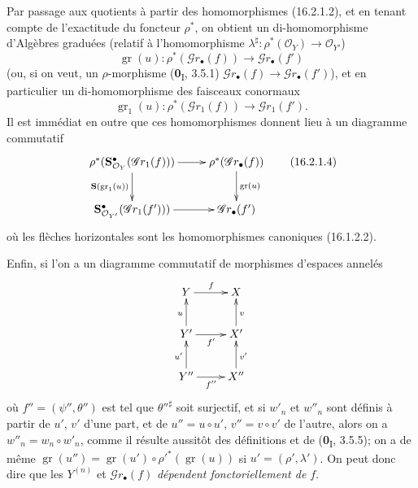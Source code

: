\begin{env}[16.2.1]
Par passage aux quotients à partir des homomorphismes (16.2.1.2), et en tenant
compte de l'exactitude du foncteur $\rho^*$, on obtient un di-homomorphisme
d'Algèbres graduées (relatif à l'homomorphisme
$\lambda^\sharp:\rho^*(\mathcal{O}_Y)\to\mathcal{O}_{Y'}$)
\[
  \operatorname{gr}(u):
  \rho^*(\mathscr{G}r_\bullet(f))
  \longrightarrow\mathscr{G}r_\bullet(f')
  \tag{16.2.1.3}
  \label{IV.16.2.1.3}
\]
(ou, si on veut, un $\rho$-morphisme (\textbf{0}\textsubscript{I}, 3.5.1)
$\mathscr{G}r_\bullet(f)\to\mathscr{G}r_\bullet(f')$), et en particulier un
di-homomorphisme des faisceaux conormaux
\[
  \operatorname{gr}_1(u):
  \rho^*(\mathscr{G}r_1(f))\longrightarrow\mathscr{G}r_1(f').
\]
Il est immédiat en outre que ces homomorphismes donnent lieu à un diagramme
commutatif
\[
  \xymatrix{
    \rho^*(\mathbf{S}_{\mathcal{O}_Y}^{\bullet}
      (\mathscr{G}r_1(f)))
      \ar[r] \ar[d]_-{\mathbf{S}(\operatorname{gr}_1(u))}
      & \rho^*(\mathscr{G}r_\bullet(f))
        \ar[d]^-{\operatorname{gr}(u)} \\
    \mathbf{S}_{\mathcal{O}_{Y'}}^{\bullet}
      (\mathscr{G}r_1(f')))
      \ar[r]
      & \mathscr{G}r_\bullet(f')
  }
  \tag{16.2.1.4}
  \label{IV.16.2.1.4}
\]
où les flèches horizontales sont les homomorphismes canoniques (16.1.2.2).

Enfin, si l'on a un diagramme commutatif de morphismes d'espaces annelés
\[
  \xymatrix{
    Y \ar[r]^f & X \\
    Y' \ar[r]_{f'} \ar[u]^u & X' \ar[u]_v \\
    Y'' \ar[r]_{f''} \ar[u]^{u'} & X'' \ar[u]_{v'}
  }
\]
où $f''=(\psi'',\theta'')$ est tel que $\theta''^\sharp$ soit surjectif, et si
$w'_n$ et $w''_n$ sont définis à partir de $u'$, $v'$ d'une part, et de
$u''=u\circ u'$, $v''=v\circ v'$ de l'autre, alors on a
$w''_n=w_n\circ w'_n$, comme il résulte aussitôt des définitions et de
(\textbf{0}\textsubscript{I}, 3.5.5); on a de même
$\operatorname{gr}(u'')=
\operatorname{gr}(u')\circ\rho'^*(\operatorname{gr}(u))$ si
$u'=(\rho',\lambda')$. On peut donc dire que les $Y^{(n)}$ et
$\mathscr{G}r_\bullet(f)$ \emph{dépendent fonctoriellement de $f$}.
\end{env}

